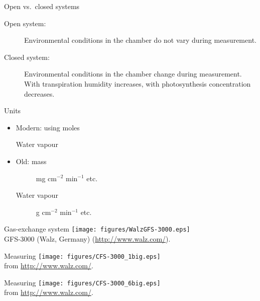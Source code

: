 \documentclass[10pt]{beamer}
\begin{document}
\begin{frame}{Open vs.\ closed systems}
    \begin{description}
        \item[Open system:] Environmental conditions in the chamber do not
        vary during measurement.
        \item[Closed system:] Environmental conditions in the chamber change during measurement.
        With transpiration humidity increases, with photosynthesis \COtwo
        concentration decreases.
    \end{description}
\end{frame}

\begin{frame}{Units}
    \begin{itemize}
        \item Modern: using moles
            \begin{description}
                \item[\COtwo] \umol
                \item[Water vapour] \mmol
            \end{description}
        \item Old: mass
            \begin{description}
                \item[\COtwo] mg cm$^{-2}$ min$^{-1}$ etc.
                \item[Water vapour] g cm$^{-2}$ min$^{-1}$ etc.
            \end{description}
    \end{itemize}
\end{frame}

\begin{frame}{Gas-exchange system}
    \centering
    \texttt{[image: figures/WalzGFS-3000.eps]}\\
    {\small GFS-3000 (Walz, Germany) (\url{http://www.walz.com/}).}
\end{frame}

\begin{frame}{Measuring}
    \centering
    \texttt{[image: figures/CFS-3000\_1big.eps]}\\
    {\small from \url{http://www.walz.com/}.}
\end{frame}

\begin{frame}{Measuring}
    \centering
    \texttt{[image: figures/CFS-3000\_6big.eps]}\\
    {\small from \url{http://www.walz.com/}.}
\end{frame}
\end{document}
